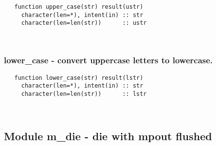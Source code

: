 \begin{verbatim} 
   function upper_case(str) result(ustr)
     character(len=*), intent(in) :: str
     character(len=len(str))      :: ustr
 \end{verbatim}%
 
 
\mbox{}\hrulefill\ 
 
  \subsubsection{lower\_case - convert uppercase letters to lowercase.}

\begin{verbatim} 
   function lower_case(str) result(lstr)
     character(len=*), intent(in) :: str
     character(len=len(str))      :: lstr
 \end{verbatim}%
%

 
\mbox{}\hrulefill\ 
 
  \subsection{Module m\_die - die with mpout flushed }

